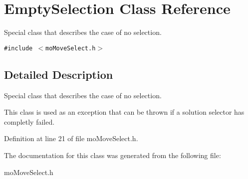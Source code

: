 \section{Empty\-Selection Class Reference}
\label{class_empty_selection}
Special class that describes the case of no selection.  


{\tt \#include $<$mo\-Move\-Select.h$>$}



\subsection{Detailed Description}
Special class that describes the case of no selection. 

This class is used as an exception that can be thrown if a solution selector has completly failed. 



Definition at line 21 of file mo\-Move\-Select.h.

The documentation for this class was generated from the following file:\begin{CompactItemize}
\item 
mo\-Move\-Select.h\end{CompactItemize}
